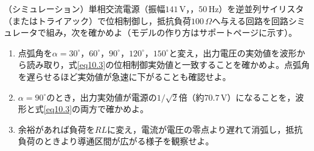 \begin{章末問題}

\item \label{ex10.7}（シミュレーション）単相交流電源（振幅$141$\,V，，$50$\,Hz）を逆並列サイリスタ（またはトライアック）で位相制御し，抵抗負荷$100\,\Omega$へ与える回路を回路シミュレータで組み，次を確かめよ（モデルの作り方はサポートページに示す）。
\begin{enumerate}
\item[(a)] 点弧角を$\alpha = 30^\circ$，$60^\circ$，$90^\circ$，$120^\circ$，$150^\circ$と変え，出力電圧の実効値を波形から読み取り，式\ref{eq10.3}の位相制御実効値と一致することを確かめよ。点弧角を遅らせるほど実効値が急速に下がることも確認せよ。
\item[(b)] $\alpha = 90^\circ$のとき，出力実効値が電源の$1/\sqrt{2}$倍（約$70.7$\,V）になることを，波形と式\ref{eq10.3}の両方で確かめよ。
\item[(c)] 余裕があれば負荷を$RL$に変え，電流が電圧の零点より遅れて消弧し，抵抗負荷のときより導通区間が広がる様子を観察せよ。
\end{enumerate}
\end{章末問題}
